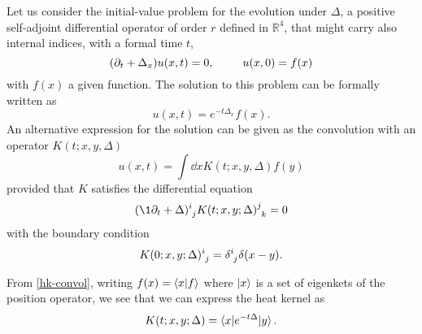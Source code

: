 Let us consider the initial-value problem for the evolution under  $\Delta$, a positive self-adjoint differential operator  of order $r$ defined in $\mathbb{R}^4$, that might carry also internal indices, with a formal time $t$,
\begin{equation}
(\partial_t  + \Delta_x )u(x,t) = 0, \hspace{2.5em} u(x,0) = f(x)
\end{equation}
with $f(x)$ a given function. The solution to this problem can be formally written as
\begin{equation}
u(x,t) = e^{-t \Delta_x} f(x).
\end{equation}
An alternative expression for the solution can be given as the convolution with an operator  $K(t;x,y,\Delta)$
\begin{equation}\label{hk-convol}
u(x,t) = \int \dd{x} K(t;x,y,\Delta) f(y)
\end{equation}
provided that  $K$ satisfies  the differential equation
\begin{equation}\label{hk-definition-heat-equation}
(\1 \partial_t + \Delta)\indices{^i_j}K(t;x,y;\Delta)\indices{^j_k}
	=
0
\end{equation}
with the boundary condition
\begin{equation}\label{hk-definition-boundary-condition}
K(0;x,y;\Delta)\indices{^i_j}
	=
\delta\indices{^i_j} \delta(x-y).
\end{equation}

From \eqref{hk-convol}, writing $f(x) = \braket{x|f}$ where $\ket{x}$ is a set of eigenkets of the position operator, we see that we can express the heat kernel as
\begin{equation}
K(t;x,y;\Delta)
	=
\braket{x | e^{- t \Delta} | y }.
\end{equation}




